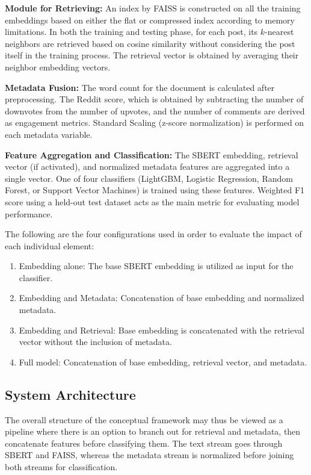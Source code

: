 \documentclass[11pt]{article}
\begin{document}
\textbf{Module for Retrieving:} An index by FAISS is constructed on all the training embeddings based on either the flat or compressed index according to memory limitations. In both the training and testing phase, for each post, its $k$-nearest neighbors are retrieved based on cosine similarity without considering the post itself in the training process. The retrieval vector is obtained by averaging their neighbor embedding vectors.

\textbf{Metadata Fusion:} The word count for the document is calculated after preprocessing. The Reddit score, which is obtained by subtracting the number of downvotes from the number of upvotes, and the number of comments are derived as engagement metrics. Standard Scaling (z-score normalization) is performed on each metadata variable.

\textbf{Feature Aggregation and Classification:} The SBERT embedding, retrieval vector (if activated), and normalized metadata features are aggregated into a single vector. One of four classifiers (LightGBM, Logistic Regression, Random Forest, or Support Vector Machines) is trained using these features. Weighted F1 score using a held-out test dataset acts as the main metric for evaluating model performance.

The following are the four configurations used in order to evaluate the impact of each individual element:
\begin{enumerate}
    \item Embedding alone: The base SBERT embedding is utilized as input for the classifier.
    \item Embedding and Metadata: Concatenation of base embedding and normalized metadata.
    \item Embedding and Retrieval: Base embedding is concatenated with the retrieval vector without the inclusion of metadata.
    \item Full model: Concatenation of base embedding, retrieval vector, and metadata.
\end{enumerate}

\subsection{System Architecture}

The overall structure of the conceptual framework may thus be viewed as a pipeline where there is an option to branch out for retrieval and metadata, then concatenate features before classifying them. The text stream goes through SBERT and FAISS, whereas the metadata stream is normalized before joining both streams for classification.
\end{document}
